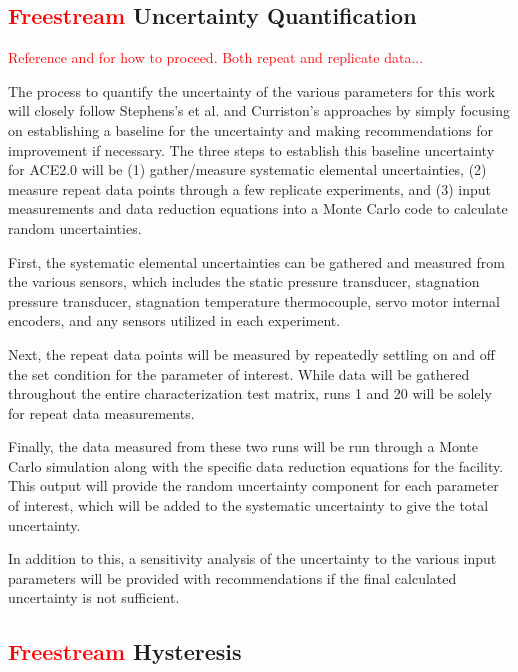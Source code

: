 \subsection{\textcolor{red}{Freestream} Uncertainty Quantification}

\textcolor{red}{Reference \cite{stephens-hubbard} and \cite{curriston} for how to proceed. Both repeat and replicate data...}

The process to quantify the uncertainty of the various parameters for this work will closely follow Stephens's et al. \cite{stephens-hubbard} and Curriston's \cite{curriston-dis} approaches by simply focusing on establishing a baseline for the uncertainty and making recommendations for improvement if necessary. The three steps to establish this baseline uncertainty for ACE2.0 will be (1) gather/measure systematic elemental uncertainties, (2) measure repeat data points through a few replicate experiments, and (3) input measurements and data reduction equations into a Monte Carlo code to calculate random uncertainties.

First, the systematic elemental uncertainties can be gathered and measured from the various sensors, which includes the static pressure transducer, stagnation pressure transducer, stagnation temperature thermocouple, servo motor internal encoders, and any sensors utilized in each experiment. 

Next, the repeat data points will be measured by repeatedly settling on and off the set condition for the parameter of interest. While data will be gathered throughout the entire characterization test matrix, runs 1 and 20 will be solely for repeat data measurements. 

Finally, the data measured from these two runs will be run through a Monte Carlo simulation along with the specific data reduction equations for the facility. This output will provide the random uncertainty component for each parameter of interest, which will be added to the systematic uncertainty to give the total uncertainty.

In addition to this, a sensitivity analysis of the uncertainty to the various input parameters will be provided with recommendations if the final calculated uncertainty is not sufficient.

\subsection{\textcolor{red}{Freestream} Hysteresis}

